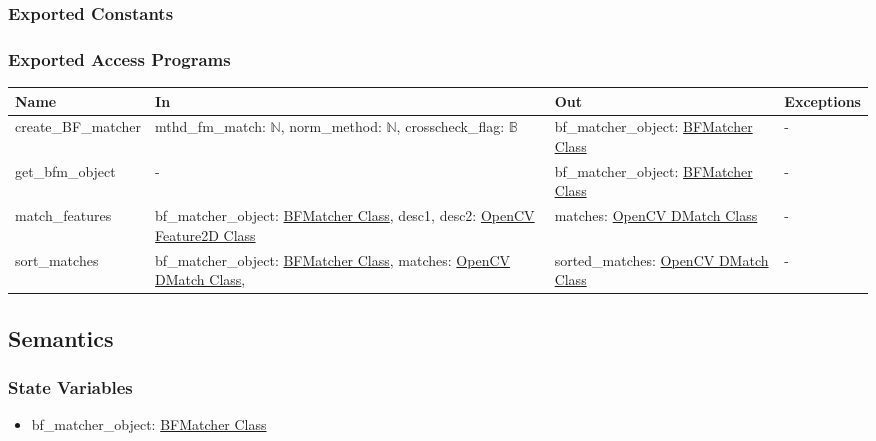 \documentclass[12pt, titlepage]{article}
\begin{document}
\subsubsection{Exported Constants}

\subsubsection{Exported Access Programs}

\begin{center}
\begin{tabular}{p{3.5cm} p{4cm} p{3.5cm} p{2.5cm}}
\hline
\textbf{Name} & \textbf{In} & \textbf{Out} & \textbf{Exceptions} \\
\hline
create\_BF\_matcher 
& mthd\_fm\_match: $\mathbb{N}$, \newline
norm\_method: $\mathbb{N}$, \newline
crosscheck\_flag: $\mathbb{B}$ 
& bf\_matcher\_object: \href{https://docs.opencv.org/3.4/d3/da1/classcv_1_1BFMatcher.html}{BFMatcher Class} 
& - \\
\hline
get\_bfm\_object 
& -
& bf\_matcher\_object: \href{https://docs.opencv.org/3.4/d3/da1/classcv_1_1BFMatcher.html}{BFMatcher Class} 
& - \\
\hline
match\_features 
& bf\_matcher\_object: \href{https://docs.opencv.org/3.4/d3/da1/classcv_1_1BFMatcher.html}{BFMatcher Class}, \newline
desc1, desc2: \href{https://docs.opencv.org/4.x/d0/d13/classcv_1_1Feature2D.html}{OpenCV Feature2D Class}
& matches: \href{https://docs.opencv.org/3.4/d4/de0/classcv_1_1DMatch.html}{OpenCV DMatch Class} 
& - \\
\hline
sort\_matches & bf\_matcher\_object: \href{https://docs.opencv.org/3.4/d3/da1/classcv_1_1BFMatcher.html}{BFMatcher Class}, \newline 
matches: \href{https://docs.opencv.org/3.4/d4/de0/classcv_1_1DMatch.html}{OpenCV DMatch Class}, \newline 
& sorted\_matches: \href{https://docs.opencv.org/3.4/d4/de0/classcv_1_1DMatch.html}{OpenCV DMatch Class}
& - \\
\hline
\end{tabular}
\end{center}

\subsection{Semantics}

\subsubsection{State Variables}
\begin{itemize}
  \item bf\_matcher\_object: \href{https://docs.opencv.org/3.4/d3/da1/classcv_1_1BFMatcher.html}{BFMatcher Class}
\end{itemize}
\end{document}
